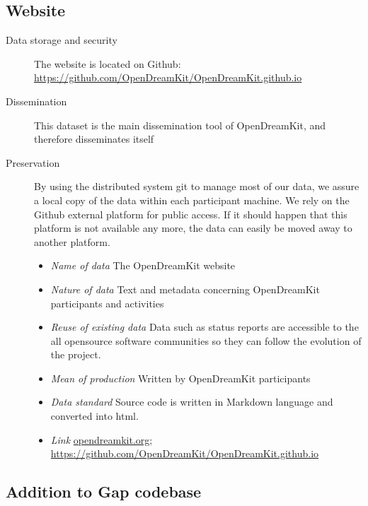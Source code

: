 \documentclass{../../Proposal/LaTeX-proposal/deliverablereport}
\begin{document}
\subsection{Website}

\begin{description}
\item[Data storage and security] The website is located on Github: \href{https://github.com/OpenDreamKit/OpenDreamKit.github.io}{https://github.com/OpenDreamKit/OpenDreamKit.github.io}
\item[Dissemination] This dataset is the main dissemination tool of OpenDreamKit, and therefore disseminates itself
\item[Preservation] By using the distributed system git to manage most of our data, we assure a local copy of the data within each participant machine. We rely on the Github external platform for public access. If it should happen that this platform is not available any more, the data can easily be moved away to another platform.
\begin{itemize}
\item\textit{Name of data} The OpenDreamKit website
\item\textit{Nature of data} Text and metadata concerning OpenDreamKit participants and activities
\item\textit{Reuse of existing data} Data such as status reports are accessible to the all opensource software communities so they can follow the evolution of the project. 
\item\textit{Mean of production} Written by OpenDreamKit participants
\item\textit{Data standard} Source code is written in Markdown language and converted into html.
\item\textit{Link} \href{http://opendreamkit.org/}{opendreamkit.org}; \href{https://github.com/OpenDreamKit/OpenDreamKit.github.io}{https://github.com/OpenDreamKit/OpenDreamKit.github.io}
\end{itemize}
\end{description}


\subsection{Addition to Gap codebase}
\end{document}
